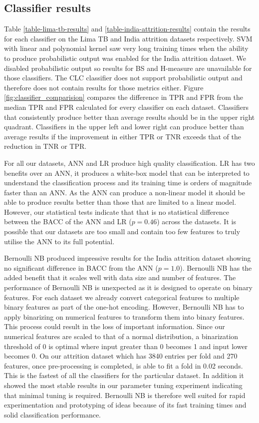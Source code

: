 \documentclass{sig-alternate-05-2015}
\begin{document}
	\subsection{Classifier results}
	\label{classifier-results}
	Table \ref{table-lima-tb-results} and \ref{table-india-attrition-results} contain the results for each classifier on the Lima TB and India attrition datasets respectively. SVM with linear and polynomial kernel saw very long training times when the ability to produce probabilistic output was enabled for the India attrition dataset. We disabled probabilistic output so results for BS and H-measure are unavailable for those classifiers. The CLC classifier does not support probabilistic output and therefore does not contain results for those metrics either. Figure \ref{fig:classifier_comparision} compares the difference in TPR and FPR from the median TPR and FPR calculated for every classifier on each dataset. Classifiers that consistently produce better than average results should be in the upper right quadrant. Classifiers in the upper left and lower right can produce better than average results if the improvement in either TPR or TNR exceeds that of the reduction in TNR or TPR. 
	
	For all our datasets, ANN and LR produce high quality classification. LR has two benefits over an ANN, it produces a white-box model that can be interpreted to understand the classification process \cite{Dreiseitl2002352} and its training time is orders of magnitude faster than an ANN. As the ANN can produce a non-linear model it should be able to produce results better than those that are limited to a linear model. However, our statistical tests indicate that that is no statistical difference between the BACC of the ANN and LR ($p=0.46$) across the datasets. It is possible that our datasets are too small and contain too few features to truly utilise the ANN to its full potential. 
	
	Bernoulli NB produced impressive results for the India attrition dataset showing no significant difference in BACC from the ANN ($p=1.0$). Bernoulli NB has the added benefit that it scales well with data size and number of features. The performance of Bernoulli NB is unexpected as it is designed to operate on binary features. For each dataset we already convert categorical features to multiple binary features as part of the one-hot encoding. However, Bernoulli NB has to apply binarizing on numerical features to transform them into binary features. This process could result in the loss of important information. Since our numerical features are scaled to that of a normal distribution, a binarization threshold of 0 is optimal where input greater than 0 becomes 1 and input lower becomes 0. On our attrition dataset which has 3840 entries per fold and 270 features, once pre-processing is completed, is able to fit a fold in 0.02 seconds. This is the fastest of all the classifiers for the particular dataset. In addition it showed the most stable results in our parameter tuning experiment indicating that minimal tuning is required. Bernoulli NB is therefore well suited for rapid experimentation and prototyping of ideas because of its fast training times and solid classification performance.
\end{document}

